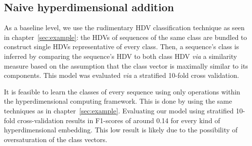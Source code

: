 \subsection*{Naive hyperdimensional addition}\label{ssec:purehdc}
As a baseline level, we use the rudimentary HDV classification technique as seen in chapter~\ref{sec:example}: the HDVs of sequences of the same class are bundled to construct single HDVs representative of every class. Then, a sequence's class is inferred by comparing the sequence's HDV to both class HDV \textit{via} a similarity measure based on the assumption that the class vector is maximally similar to its components. This model was evaluated \textit{via} a stratified 10-fold cross validation.
\begin{table}[h]
    \caption{\label{tab:phalpclass}Results of type classifications using the principal classification technique of hyperdimensional computing and an XGBoost classifier with several kinds of embeddings}
\end{table}

It is feasible to learn the classes of every sequence using only operations within the hyperdimensional computing framework. This is done by using the same techniques as in chapter~\ref{sec:example}. Evaluating our model using stratified 10-fold cross-validation results in F1-scores of around 0.14 for every kind of hyperdimensional embedding. This low result is likely due to the possibility of oversaturation of the class vectors.

